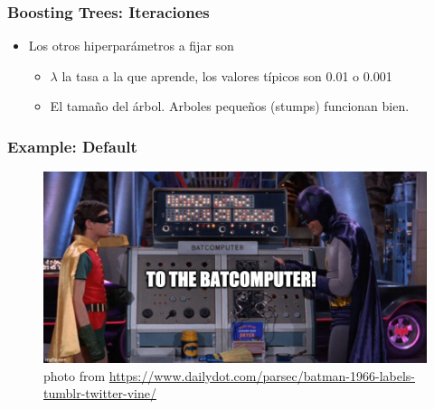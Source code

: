 \documentclass[
  shownotes,
  xcolor={svgnames},
  hyperref={colorlinks,citecolor=DarkBlue,linkcolor=andesred,urlcolor=DarkBlue}
  , aspectratio=169]{beamer}
\begin{document}
\begin{frame}[fragile]
\frametitle{Boosting Trees: Iteraciones}

\begin{itemize}

\item Los otros hiperparámetros a fijar son
\bigskip
\begin{itemize}
  \item $\lambda$ la tasa a la que aprende, los valores típicos son 0.01 o 0.001
\bigskip
\item El tamaño del árbol. Arboles pequeños (stumps) funcionan bien.
\end{itemize}
\end{itemize}
\end{frame}
\begin{frame}[fragile]
\frametitle{Example: Default}
\begin{figure}[H] \centering
  \centering
  \includegraphics[scale=0.35]{figures/baticomputer_meme.jpg}
  \\
  \tiny photo from \url{https://www.dailydot.com/parsec/batman-1966-labels-tumblr-twitter-vine/}
\end{figure}


\end{frame}

\end{document}
